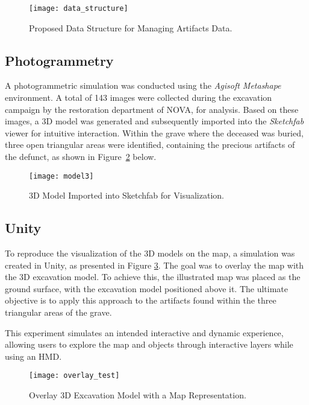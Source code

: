 \begin{figure}[h]
    \centering
    \texttt{[image: data\_structure]}
    \caption{Proposed Data Structure for Managing Artifacts Data.}
    \label{fig:data_strucutre}
\end{figure}


\subsection{Photogrammetry}
\label{sec:photogrammetry_previous} 

A photogrammetric simulation was conducted using the \textit{Agisoft Metashape} environment. A total of 143 images were collected during the excavation campaign by the restoration department of NOVA, for analysis. 
Based on these images, a \gls{3D} model was generated and subsequently imported into the \textit{Sketchfab} viewer for intuitive interaction.
Within the grave where the deceased was buried, three open triangular areas were identified, containing the precious artifacts of the defunct, as shown in Figure~\ref{fig:model3} below.

\begin{figure}[h]
    \centering
    \texttt{[image: model3]}
    \caption{\gls{3D} Model Imported into Sketchfab for Visualization.}
    \label{fig:model3}
\end{figure}


\subsection{Unity}
\label{sec:unity} 

To reproduce the visualization of the \gls{3D} models on the map, a simulation was created in Unity, as presented in Figure \ref{fig:overlay}. The goal was to overlay the map with the \gls{3D} excavation model.
To achieve this, the illustrated map was placed as the ground surface, with the excavation model positioned above it. The ultimate objective is to apply this approach to the artifacts found within the three triangular areas of the grave.

This experiment simulates an intended interactive and dynamic experience, allowing users to explore the map and objects through interactive layers while using an \gls{HMD}.


\begin{figure}[h]
    \centering
    \texttt{[image: overlay\_test]}
    \caption{Overlay \gls{3D} Excavation Model with a Map Representation.}
    \label{fig:overlay}
\end{figure}


